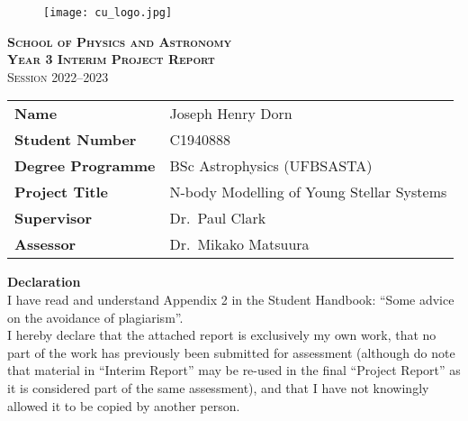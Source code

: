 \begin{center}


\begin{figure}
    \centering
    \vspace*{4em}
    \texttt{[image: cu\_logo.jpg]}
\end{figure}

\vspace*{2em}

{\huge\scshape\bfseries School of Physics and Astronomy}\\
\vspace*{2em}
{\Huge\scshape\bfseries Year 3 Interim Project Report}\\
\vspace*{1em}
{\LARGE\scshape Session 2022--2023}\\

\vspace*{4em}

\begin{tabularx}{0.8\textwidth} { 
    | >{\raggedright\arraybackslash\bfseries}l 
      >{\raggedleft\arraybackslash}X }
    Name & Joseph Henry Dorn \\ [0.5ex]
    Student Number  & C1940888 \\ [0.5ex]
    Degree Programme  & BSc Astrophysics (UFBSASTA) \\ [0.5ex]
    Project Title  & N-body Modelling of Young Stellar Systems \\ [0.5ex]
    Supervisor  & Dr.\ Paul Clark \\ [0.5ex]
    Assessor  & Dr.\ Mikako Matsuura \\ [0.5ex]
\end{tabularx}

\vspace*{8em}

\begin{adjustwidth}{0.1\textwidth}{0.1\textwidth}
    {\large\bfseries Declaration} \\ [0ex]
    I have read and understand Appendix 2 in the Student Handbook: “Some advice on the avoidance of plagiarism”. \\ [2ex] 
    I hereby declare that the attached report is exclusively my own work, that no part of the work has previously been submitted for assessment (although do note that material in “Interim Report” may be re-used in the final “Project Report” as it is considered part of the same assessment), and that I have not knowingly allowed it to be copied by another person.
\end{adjustwidth}

\end{center}

\thispagestyle{empty} %
